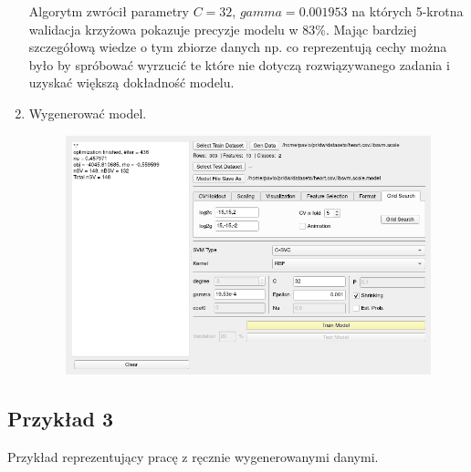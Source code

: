 \documentclass[paper=a4, fontsize=11pt]{scrartcl} %
\numberwithin{equation}{section} %
\numberwithin{figure}{section} %
\begin{document}
\begin{enumerate}[label={\textbf{Krok \theenumi :}},leftmargin=*]
    Algorytm zwrócił parametry $C=32$, $gamma=0.001953$ na których 5-krotna walidacja
    krzyżowa pokazuje precyzje modelu w 83\%. Mając bardziej szczegółową wiedze o tym zbiorze
    danych np. co reprezentują cechy można było by spróbować wyrzucić te które nie dotyczą
    rozwiązywanego zadania i uzyskać większą dokładność modelu.

    \item Wygenerować model.

    \begin{figure}[H]
        \begin{center}
            \includegraphics[scale=0.7]{./img/ex2_st5.png}
        \end{center}
    \end{figure}

\end{enumerate}

\subsection{Przykład 3}
    \par Przykład reprezentujący pracę z ręcznie wygenerowanymi danymi.
\end{document}
